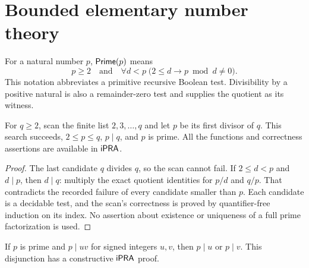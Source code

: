 \section{Bounded elementary number theory}
\label{sec:elementary}

\begin{definition}[Primality]
For a natural number $p$, $\mathsf{Prime}(p)$ means
\[
 p\ge2\quad\text{and}\quad
 \forall d<p\;\bigl(2\le d\to p\bmod d\ne0\bigr).
\]
This notation abbreviates a primitive recursive Boolean test. Divisibility
by a positive natural is also a remainder-zero test and supplies the
quotient as its witness.
\end{definition}

\begin{lemma}
\label{lem:lpf}
For $q\ge2$, scan the finite list $2,3,\ldots,q$ and let $p$ be its first
divisor of $q$. This search succeeds, $2\le p\le q$, $p\mid q$, and $p$ is
prime. All the functions and correctness assertions are available in $\mathsf{iPRA}$.
\end{lemma}

\begin{proof}
The last candidate $q$ divides $q$, so the scan cannot fail. If
$2\le d<p$ and $d\mid p$, then $d\mid q$: multiply the exact quotient
identities for $p/d$ and $q/p$. That contradicts the recorded failure of
every candidate smaller than $p$. Each candidate is a decidable test, and
the scan's correctness is proved by quantifier-free induction on its index.
No assertion about existence or uniqueness of a full prime factorization
is used.
\end{proof}

\begin{lemma}
\label{lem:euclid}
If $p$ is prime and $p\mid uv$ for signed integers $u,v$, then
$p\mid u$ or $p\mid v$. This disjunction has a constructive $\mathsf{iPRA}$ proof.
\end{lemma}

